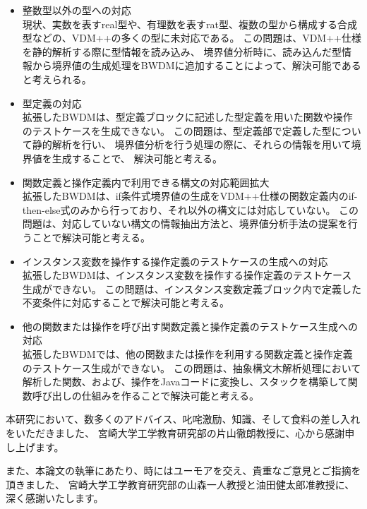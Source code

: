 \documentclass[uplatex, report, a4j, 10pt]{jsbook}
\begin{document}
\begin{itemize}
  \item 整数型以外の型への対応\\
        現状、実数を表すreal型や、有理数を表すrat型、複数の型から構成する合成型などの、VDM++の多くの型に未対応である。
        この問題は、VDM++仕様を静的解析する際に型情報を読み込み、
        境界値分析時に、読み込んだ型情報から境界値の生成処理をBWDMに追加することによって、解決可能であると考えられる。

  \item 型定義の対応\\
        拡張したBWDMは、型定義ブロックに記述した型定義を用いた関数や操作のテストケースを生成できない。
        この問題は、型定義部で定義した型について静的解析を行い、
        境界値分析を行う処理の際に、それらの情報を用いて境界値を生成することで、
        解決可能と考える。

  \item 関数定義と操作定義内で利用できる構文の対応範囲拡大\\
        拡張したBWDMは、if条件式境界値の生成をVDM++仕様の関数定義内のif-then-else式のみから行っており、それ以外の構文には対応していない。
        この問題は、対応していない構文の情報抽出方法と、境界値分析手法の提案を行うことで解決可能と考える。

  \item インスタンス変数を操作する操作定義のテストケースの生成への対応\\
        拡張したBWDMは、インスタンス変数を操作する操作定義のテストケース生成ができない。
        この問題は、インスタンス変数定義ブロック内で定義した不変条件に対応することで解決可能と考える。

  \item 他の関数または操作を呼び出す関数定義と操作定義のテストケース生成への対応\\
        拡張したBWDMでは、他の関数または操作を利用する関数定義と操作定義のテストケース生成ができない。
        この問題は、抽象構文木解析処理において解析した関数、および、操作をJavaコードに変換し、スタックを構築して関数呼び出しの仕組みを作ることで解決可能と考える。
\end{itemize}

%
\acknowledgment{}
本研究において、数多くのアドバイス、叱咤激励、知識、そして食料の差し入れをいただきました、
宮崎大学工学教育研究部の片山徹朗教授に、心から感謝申し上げます。

また、本論文の執筆にあたり、時にはユーモアを交え、貴重なご意見とご指摘を頂きました、
宮崎大学工学教育研究部の山森一人教授と油田健太郎准教授に、深く感謝いたします。
\end{document}
